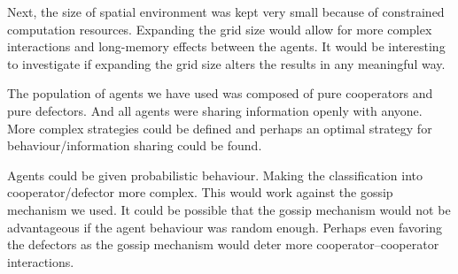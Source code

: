 \documentclass[english]{article}
\begin{document}
Next, the size of spatial environment was kept very small because of constrained computation resources. Expanding the grid size would allow for more complex interactions and long-memory effects between the agents.
It would be interesting to investigate if expanding the grid size alters the results in any meaningful way.

The population of agents we have used was composed of pure cooperators and pure defectors.
And all agents were sharing information openly with anyone.
More complex strategies could be defined and perhaps an optimal strategy for behaviour/information sharing could be found.

Agents could be given probabilistic behaviour. Making the classification into cooperator/defector more complex. This would work against the gossip mechanism we used.
It could be possible that the gossip mechanism would not be advantageous if the agent behaviour was random enough.
Perhaps even favoring the defectors as the gossip mechanism would deter more cooperator--cooperator interactions.



\pagebreak

\end{document}
